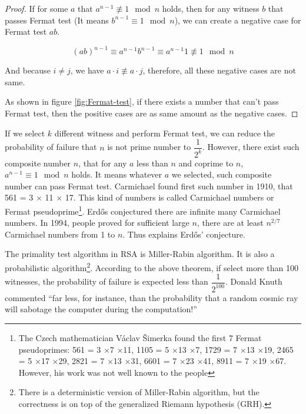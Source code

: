 \documentclass[b5paper]{article}
\begin{document}
\begin{proof}
If for some $a$ that $a^{n-1} \not\equiv 1 \mod n$ holds, then for any witness $b$ that passes Fermat test (It means $b^{n-1} \equiv 1 \mod n$), we can create a negative case for Fermat test $ab$.

\[
(ab)^{n-1} \equiv a^{n-1}b^{n-1} \equiv a^{n-1}1 \not\equiv 1 \mod n
\]

And because $i \neq j$, we have $a \cdot i \not\equiv a \cdot j$, therefore, all these negative cases are not same.

As shown in figure \ref{fig:Fermat-test}, if there exists a number that can't pass Fermat test, then the positive cases are as same amount as the negative cases.
\end{proof}

If we select $k$ different witness and perform Fermat test, we can reduce the probability of failure that $n$ is not prime number to $\dfrac{1}{2^k}$. However, there exist such composite number $n$, that for any $a$ less than $n$ and coprime to $n$, $a^{n-1} \equiv 1 \mod n$ holds. It means whatever $a$ we selected, such composite number can pass Fermat test. Carmichael found first such number in 1910, that 561 = 3 $\times$ 11 $\times$ 17. This kind of numbers is called Carmichael numbers or Fermat pseudoprime\footnote{The Czech mathematician Václav Šimerka found the first 7 Fermat pseudoprimes: 561 = 3 $\times$7 $\times$11, 1105 = 5 $\times$13 $\times$7, 1729 = 7 $\times$13 $\times$19, 2465 = 5 $\times$17 $\times$29, 2821 = 7 $\times$13 $\times$31, 6601 = 7 $\times$23 $\times$41, 8911 = 7 $\times$19 $\times$67. However, his work was not well known to the people}. Erdős conjectured there are infinite many Carmichael numbers. In 1994, people proved for sufficient large $n$, there are at least $n^{2/7}$ Carmichael numbers from 1 to $n$. Thus explains Erdős' conjecture\cite{Wiki-Carmichael-number}.

The primality test algorithm in RSA is Miller-Rabin algorithm. It is also a probabilistic algorithm\footnote{There is a deterministic version of Miller-Rabin algorithm, but the correctness is on top of the generalized Riemann hypothesis (GRH)\cite{Wiki-Miller-Rabin}.}. According to the above theorem, if select more than 100 witnesses, the probability of failure is expected less than $\dfrac{1}{2^{100}}$. Donald Knuth commented ``far less, for instance, than the probability that a random cosmic ray will sabotage the computer during the computation!''

\end{document}

